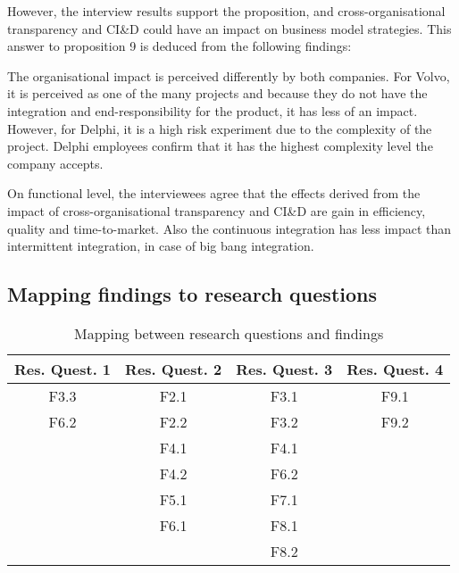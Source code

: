 However, the interview results support the proposition, and cross-organisational transparency and CI\&D could have an impact on business model strategies. This answer to proposition 9 is deduced from the following findings:

 The organisational impact is perceived differently by both companies. For Volvo, it is perceived as one of the many projects and because they do not have the integration and end-responsibility for the product, it has less of an impact. However, for Delphi, it is a high risk experiment due to the complexity of the project. Delphi employees confirm that it has the highest complexity level the company accepts.

 On functional level, the interviewees agree that the effects derived from the impact of cross-organisational transparency and CI\&D are gain in efficiency, quality and time-to-market. Also the continuous integration has less impact than intermittent integration, in case of big bang integration.  

\subsection{Mapping findings to research questions}\label{sec:findings_RQs}


\begin{table}[htb]
\centering
\begin{tabular}{|c|c|c|c|}\hline
{\bf Res. Quest. 1} & {\bf Res. Quest. 2} & {\bf Res. Quest. 3} & {\bf Res. Quest. 4}\\ \hline
F3.3 & F2.1 & F3.1 & F9.1\\ \hline
F6.2 & F2.2 & F3.2 & F9.2\\ \hline
		 & F4.1 & F4.1 &\\ \hline
		 & F4.2	& F6.2 &\\ \hline
		 & F5.1 & F7.1 &\\ \hline
		 & F6.1 & F8.1 &\\ \hline
		 & 			& F8.2 &\\ \hline		
\end{tabular}
\caption{Mapping between research questions and findings}
\label{tab:mapping}
\vspace{-.4cm}
\end{table}



%
